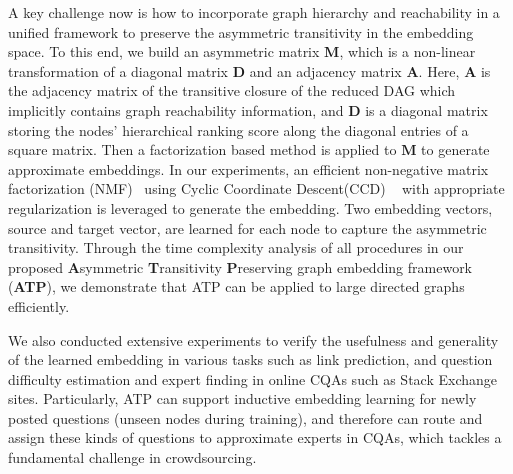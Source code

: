 \documentclass[letterpaper]{article} \usepackage{aaai19}  \usepackage{times}  \usepackage{helvet}  \usepackage{courier}  \usepackage{url}  \usepackage{graphicx}  \usepackage{booktabs} \usepackage{xcolor}
\begin{document}
A key challenge now is how to incorporate graph hierarchy and reachability in a unified framework to preserve the asymmetric transitivity in the embedding space. To this end, we build an asymmetric matrix $\boldsymbol{M}$, which is a non-linear transformation of a diagonal matrix $\boldsymbol{D}$ and an adjacency matrix $\boldsymbol{A}$. Here, $\boldsymbol{A}$ is the adjacency matrix of the transitive closure of the reduced DAG which implicitly contains graph reachability information, and $\boldsymbol{D}$ is a diagonal matrix storing the nodes' hierarchical ranking score along the diagonal entries of a square matrix. Then a factorization based method is applied to $\boldsymbol{M}$ to generate approximate embeddings. In our experiments, an efficient non-negative matrix factorization (NMF)~\cite{Cheng2017LRA} using Cyclic Coordinate Descent(CCD) ~\cite{Nisa2017} with appropriate regularization is leveraged to generate the embedding. Two embedding vectors, source and target vector, are learned for each node to capture the asymmetric transitivity. Through the time complexity analysis of all procedures in our proposed {\bf A}symmetric {\bf T}ransitivity {\bf P}reserving graph embedding framework ({\bf ATP}), we demonstrate that ATP can be applied to large directed graphs efficiently. 

We also conducted extensive experiments to verify the usefulness and generality of the learned embedding in various tasks such as link prediction, and question difficulty estimation and expert finding in online CQAs such as Stack Exchange sites. Particularly, ATP can support inductive embedding learning for newly posted questions (unseen nodes during training), and therefore can route and assign these kinds of questions to approximate experts in CQAs, which tackles a fundamental challenge in crowdsourcing. 
\end{document}
